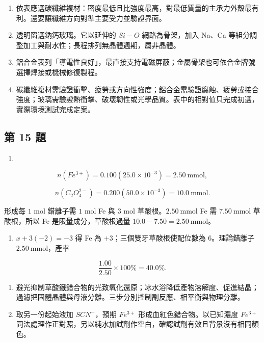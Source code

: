\documentclass[11pt,a4paper]{article}
\providecommand{\tightlist}{%
  \setlength{\itemsep}{0pt}\setlength{\parskip}{0pt}}
\begin{document}
\begin{enumerate}
\def\labelenumi{(\alph{enumi})}
\item
  依表應選碳纖維複材：密度最低且比強度最高，對最低質量的主承力外殼最有利。還要讓纖維方向對準主要受力並驗證界面。
\item
  透明窗選鈉鈣玻璃。它以延伸的 \(Si-O\) 網路為骨架，加入 Na、Ca 等組分調整加工與耐水性；長程排列無晶體週期，屬非晶體。
\item
  鋁合金表列「導電性良好」，最直接支持電磁屏蔽；金屬骨架也可依合金牌號選擇焊接或機械修復製程。
\item
  碳纖維複材需驗證衝擊、疲勞或方向性強度；鋁合金需驗證腐蝕、疲勞或接合強度；玻璃需驗證熱衝擊、破壞韌性或光學品質。表中的相對值只完成初選，實際環境測試完成定案。
\end{enumerate}

\subsection{第 15 題}\label{ux7b2c-15-ux984c}

\begin{enumerate}
\def\labelenumi{(\alph{enumi})}
\tightlist
\item
\end{enumerate}

\[
n(Fe^{3+})=0.100(25.0\times10^{-3})=2.50\ \mathrm{mmol},
\]

\[
n(C_2O_4^{2-})=0.200(50.0\times10^{-3})=10.0\ \mathrm{mmol}.
\]

形成每 \(1\) mol 錯離子需 \(1\) mol Fe 與 \(3\) mol 草酸根。\(2.50\ \mathrm{mmol}\) Fe 需 \(7.50\ \mathrm{mmol}\) 草酸根，所以 Fe 是限量成分，草酸根過量 \(10.0-7.50=2.50\ \mathrm{mmol}\)。

\begin{enumerate}
\def\labelenumi{(\alph{enumi})}
\setcounter{enumi}{1}
\tightlist
\item
  \(x+3(-2)=-3\) 得 Fe 為 \(+3\)；三個雙牙草酸根使配位數為 \(6\)。理論錯離子 \(2.50\ \mathrm{mmol}\)，產率
\end{enumerate}

\[
\frac{1.00}{2.50}\times100\%=40.0\%.
\]

\begin{enumerate}
\def\labelenumi{(\alph{enumi})}
\setcounter{enumi}{2}
\item
  避光抑制草酸鐵錯合物的光致氧化還原；冰水浴降低產物溶解度、促進結晶；過濾把固體晶體與母液分離。三步分別控制副反應、相平衡與物理分離。
\item
  取另一份起始液加 \(SCN^-\)，預期 \(Fe^{3+}\) 形成血紅色錯合物。以已知濃度 \(Fe^{3+}\) 同法處理作正對照，另以純水加試劑作空白，確認試劑有效且背景沒有相同顏色。
\end{enumerate}
\end{document}
